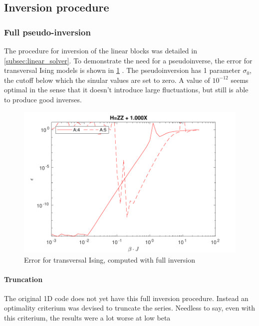 \subsection{Inversion procedure}

\subsubsection{Full pseudo-inversion}

The procedure for inversion of the linear blocks was detailed in \cref{subsec:linear_solver}. To demonstrate the need for a pseudoinverse, the error for transversal Ising models is shown in \cref{benc:fig:fullinv} . The pseudoinversion has 1 parameter $\sigma_0$, the cutoff below which the sinular values are set to zero. A value of $10^{-12}$ seems optimal in the sense that it doesn't introduce large fluctuations, but still is able to produce good inverses.

\begin{figure}
    \center
    \includegraphics[width=\textwidth]{Figuren/benchmarking/t_ising_full_inverse.pdf }
    \caption{Error for transversal Ising, computed with full inversion }
    \label{benc:fig:fullinv}
\end{figure}

\paragraph{Truncation}

The original 1D code does not yet have this full inversion procedure. Instead an optimality criterium was devised to truncate the series. Needless to say, even with this criterium, the results were a lot worse at low beta

